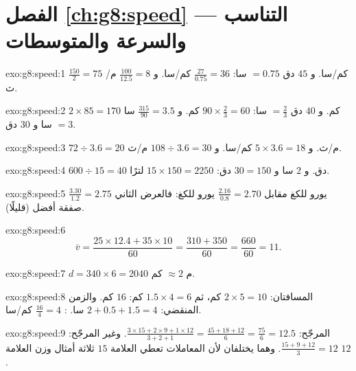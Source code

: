 \section*{الفصل \ref{ch:g8:speed} --- التناسب والسرعة والمتوسطات}

\begin{solution}{exo:g8:speed:1}
$\frac{150}{2} = 75$ كم/سا. \quad
و $45$ دق $= 0.75$ سا: $\frac{27}{0.75} = 36$ كم/سا. \quad
و $\frac{100}{12.5} = 8$ م/ث.
\end{solution}

\begin{solution}{exo:g8:speed:2}
$2 \times 85 = 170$ كم. \quad
و $40$ دق $= \frac23$ سا: $90 \times \frac23 = 60$ كم. \quad
و $\frac{315}{90} = 3.5$ سا $= 3$ سا و $30$ دق.
\end{solution}

\begin{solution}{exo:g8:speed:3}
$72 \div 3.6 = 20$ م/ث. \quad
و $5 \times 3.6 = 18$ كم/سا. \quad
و $108 \div 3.6 = 30$ م/ث.
\end{solution}

\begin{solution}{exo:g8:speed:4}
$600 \div 15 = 40$ دق. \quad
و $2$ سا و $30 = 150$ دق: $15 \times 150 = 2250$ لترًا.
\end{solution}

\begin{solution}{exo:g8:speed:5}
$\frac{3.30}{1.2} = 2.75$ يورو للكغ مقابل
$\frac{2.16}{0.8} = 2.70$ يورو للكغ: فالعرض الثاني صفقة أفضل
(قليلًا).
\end{solution}

\begin{solution}{exo:g8:speed:6}
\[
\bar v = \frac{25 \times 12.4 + 35 \times 10}{60}
= \frac{310 + 350}{60} = \frac{660}{60} = 11 .
\]
\end{solution}

\begin{solution}{exo:g8:speed:7}
$d = 340 \times 6 = 2040$ م $\approx 2$ كم.
\end{solution}

\begin{solution}{exo:g8:speed:8}
المسافتان: $2 \times 5 = 10$ كم، ثم $1.5 \times 4 = 6$ كم: 
$16$ كم. والزمن المنقضي: $2 + 0.5 + 1.5 = 4$ سا. :
$\frac{16}{4} = 4$ كم/سا.
\end{solution}

\begin{solution}{exo:g8:speed:9}
المرجّح:
$\frac{3 \times 15 + 2 \times 9 + 1 \times 12}{3 + 2 + 1}
= \frac{45 + 18 + 12}{6} = \frac{75}{6} = 12.5$.
وغير المرجّح: $\frac{15 + 9 + 12}{3} = 12$. وهما يختلفان لأن
المعاملات تعطي العلامة $15$ ثلاثة أمثال وزن العلامة
$12$.
\end{solution}

